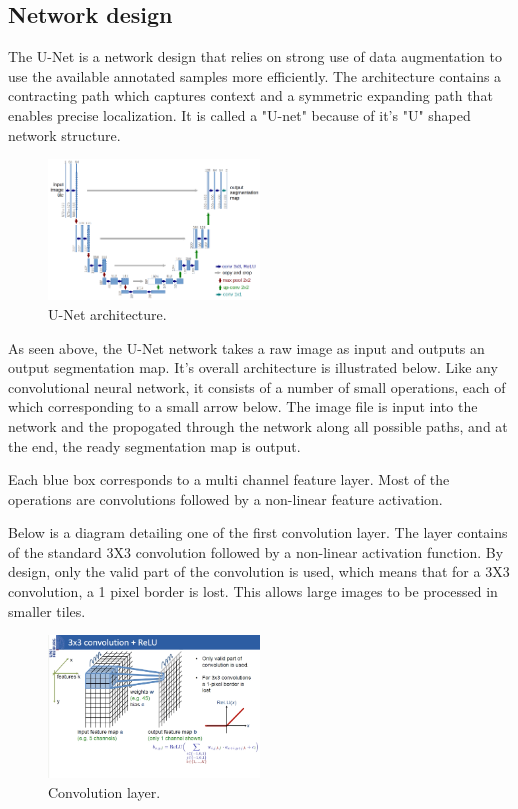 \documentclass[letterpaper]{article}
\begin{document}
\subsection{Network design}
The U-Net is a network design that relies on strong use of data augmentation to use the available annotated samples more efficiently. The architecture contains a contracting path which captures context and a symmetric expanding path that enables precise localization. It is called a "U-net" because of it's "U" shaped network structure.


 \begin{figure}[H]
  \centerline{\includegraphics[width=0.5\textwidth]{Images/UNET.png}}
  \caption{U-Net architecture.}
  \label{fig:unet}
\end{figure}

As seen above, the U-Net network takes a raw image as input and outputs an output segmentation map. 
It's overall architecture is illustrated below. Like any convolutional neural network, it consists of a number of small operations, each of which corresponding to a small arrow below. The image file is input into the network and the propogated through the network along all possible paths,  and at the end, the ready segmentation map is output.

Each blue box corresponds to a multi channel feature layer. Most of the operations are convolutions followed by a non-linear feature activation. 

Below is a diagram detailing one of the first convolution layer. The layer contains of the standard 3X3 convolution followed by a non-linear activation function. By design, only the valid part of the convolution is used, which means that for a 3X3 convolution, a 1 pixel border is lost. This allows large images to be processed in smaller tiles. 	

 \begin{figure}[H]
  \centerline{\includegraphics[width=0.5\textwidth]{Images/UNET1.png}}
  \caption{Convolution layer.}
  \label{fig:unet1}
\end{figure}
\end{document}
